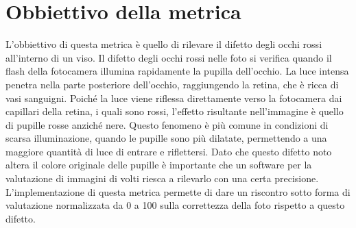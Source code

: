 \documentclass[12pt,a4paper,openright,twoside]{book}
\begin{document}
\section{Obbiettivo della metrica}
L'obbiettivo di questa metrica è quello di rilevare il difetto degli occhi rossi all'interno di un viso. 
Il difetto degli occhi rossi nelle foto si verifica quando il flash della fotocamera illumina rapidamente la pupilla dell'occhio. La luce intensa penetra nella parte posteriore dell'occhio, raggiungendo la retina, che è ricca di vasi sanguigni. Poiché la luce viene riflessa direttamente verso la fotocamera dai capillari della retina, i quali sono rossi, l'effetto risultante nell'immagine è quello di pupille rosse anziché nere. Questo fenomeno è più comune in condizioni di scarsa illuminazione, quando le pupille sono più dilatate, permettendo a una maggiore quantità di luce di entrare e riflettersi.
Dato che questo difetto noto altera il colore originale delle pupille è importante che un software per la valutazione di immagini di volti riesca a rilevarlo con una certa precisione.
L'implementazione di questa metrica permette di dare un riscontro sotto forma di valutazione normalizzata da 0 a 100 sulla correttezza della foto rispetto a questo difetto.
\end{document}
